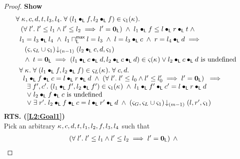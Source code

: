 \begin{lemma}[]
\begin{proof}
\noindent\textbf{Show}
\begin{align}
	&\for{\ca{}, c, d, t, l_3, l_4}\for{(l_1 \composeL f, l_2 \composeL f) \in \amod{1}(\ca{})} \nonumber\\
	&\hspace*{0.2cm} \left(\for{l'} l' \leq l_1 \land l' \leq l_2 \implies l' = \unitL\right)\;\land\; l_1 \composeL f \leq  l \composeL r \composeL t \;\land \nonumber\\
	&\hspace*{0.2cm}  l_1 = l_3 \composeL l_4 \;\land\; l_1 \maxMeetL l = l_3 \;\land\; l = l_3 \composeL c \;\land\; r = l_4 \composeL d\implies \nonumber\\
	& \hspace*{0.4cm} \extendsAMUpto{\amod{}, \amod{L} \cup \amod{1}}{(n-1)}{l_2 \composeL c}{d}{\amod{1}} \nonumber\\
	& \hspace*{0.4cm}\land\; t = \unitL \implies (l_1 \composeL c \composeL d, l_2 \composeL c \composeL d) \in \amod{}(\ca{}) \lor l_2 \composeL c \composeL d \text{ is undefined} 
\label{L2:Goal1}\\
%
	&
  \begin{array}{l}
  	\for{\ca{}} \for{(l_1 \composeL f, l_2 \composeL f) \in \amod{L}(\ca{})} \for{c, d} \\
  \hspace*{0.2cm} l_1 \composeL f \composeL c = l \composeL r \composeL d \;\land\; \left(\for{l'} l' \leq l_0 \land l' \leq l'_0 \implies l' = \unitL\right)  \;\implies\\
  \hspace*{0.4cm}\exsts{f', c'} (l_1 \composeL f', l_2 \composeL f') \in \amod{1}(\ca{}) \;\land\; l_1 \composeL f' \composeL c' =  l \composeL r \composeL d\\
		\hspace*{0.4cm}\lor\;l_2 \composeL f \composeL c \text{ is undefined}\\
		\hspace*{0.4cm}\lor\; \exsts{r'} l_2 \composeL f \composeL c = l \composeL r' \composeL d \;\land\; \extendsAMUpto{\amod{G}, \amod{L} \cup \amod{1}}{(m-1)}{l}{r'}{\amod{1}}
	\end{array}\label{L2:Goal2}
% 
\end{align}
%
%
%
%
%
%
\textbf{RTS. (\ref{L2:Goal1})}\\
Pick an arbitrary $\kappa_{}, c, d, t, l_1, l_2, f, l_3, l_4$ such that 
\begin{align}
	&\left(\for{l'} l' \leq l_1 \land l' \leq l_2 \implies l' = \unitL\right)\;\land

\end{align}
\end{proof}
\end{lemma}
